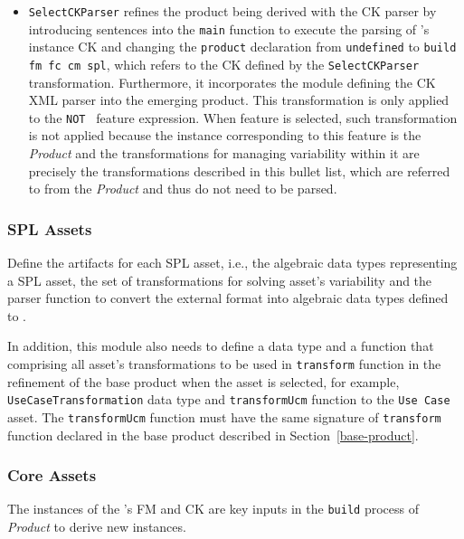 \begin{itemize}
\item \texttt{SelectCKParser} refines the product being derived with the CK parser by introducing sentences into the \texttt{main} function to execute the parsing of \hpl's instance CK and changing the \texttt{product} declaration from \texttt{undefined} to \texttt{build fm fc cm spl}, which refers to the CK defined by the \texttt{SelectCKParser} transformation. Furthermore, it incorporates the module defining the CK XML parser into the emerging product. This transformation is only applied to the \texttt{NOT \hp{}} feature expression. When \texttt{\hp{}} feature is selected, such transformation is not applied because the instance corresponding to this feature is the \hp{} \emph{Product} and the transformations for managing variability within it are precisely the transformations described in this bullet list, which are referred to from the \hp{} \emph{Product} and thus do not need to be parsed.
\end{itemize}


\subsubsection{SPL Assets} 
\label{spl-assets}

Define the artifacts for each SPL asset, i.e., the algebraic data types representing a SPL asset, the set of transformations for solving asset's variability and the parser function to convert the external format into algebraic data types defined to \hpl.

In addition, this module also needs to define a data type and a function that comprising all asset's transformations to be used in \texttt{transform} function in the refinement of the base product when the asset is selected, for example, \texttt{UseCaseTransformation} data type and \texttt{transformUcm} function to the \texttt{Use Case} asset. The \texttt{transformUcm} function must have the same signature of \texttt{transform} function declared in the base product described in Section~\ref{base-product}.


\subsubsection{Core Assets} \label{core-assets}

The instances of the \hpl{}'s FM and CK are key inputs in the \texttt{build} process of \textit{\hp{} Product} to derive new \hpl{} instances.

